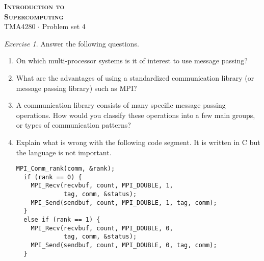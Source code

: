 \documentclass[onecolumn, oneside, a4paper, 11pt]{memoir}
\theoremstyle{remark}
\newtheorem{ex}{Exercise}
\begin{document}
\pagestyle{empty}

\begin{center}
  {\Huge \bfseries \scshape
    Introduction to \\[0.2\baselineskip] Supercomputing} \\[2\baselineskip]
  {\Large TMA4280 $\cdot$ Problem set 4} \\[2\baselineskip]
\end{center}

\begin{ex} Answer the following questions.
  \begin{enumerate}
  \item On which multi-processor systems is it of interest to use message
    passing?
  \item What are the advantages of using a standardized communication library
    (or message passing library) such as MPI?
  \item A communication library consists of many specific message passing
    operations. How would you classify these operations into a few main groups,
    or types of communication patterns?
  \item Explain what is wrong with the following code segment. It is written in
    C but the language is not important.
    \begin{lstlisting}[style=c]
  MPI_Comm_rank(comm, &rank);
  if (rank == 0) {
    MPI_Recv(recvbuf, count, MPI_DOUBLE, 1,
             tag, comm, &status);
    MPI_Send(sendbuf, count, MPI_DOUBLE, 1, tag, comm);
  }
  else if (rank == 1) {
    MPI_Recv(recvbuf, count, MPI_DOUBLE, 0,
             tag, comm, &status);
    MPI_Send(sendbuf, count, MPI_DOUBLE, 0, tag, comm);
  }
    \end{lstlisting}
  \end{enumerate}
\end{ex}
\end{document}
